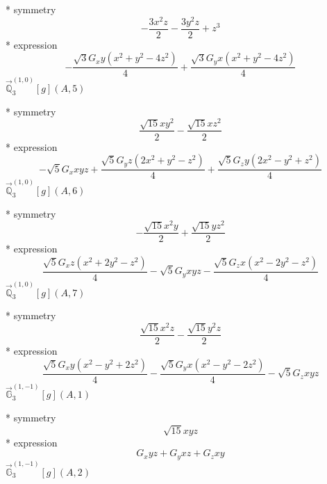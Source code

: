 \documentclass[fleqn,8pt]{jsarticle}
\begin{document}
\noindent\quad ** symmetry
\begin{dmath*}
- \frac{3 x^{2} z}{2} - \frac{3 y^{2} z}{2} + z^{3}
\end{dmath*}
\noindent\quad ** expression
\begin{dmath*}
- \frac{\sqrt{3} G_{x} y \left(x^{2} + y^{2} - 4 z^{2}\right)}{4} + \frac{\sqrt{3} G_{y} x \left(x^{2} + y^{2} - 4 z^{2}\right)}{4}
\end{dmath*}
\noindent\quad $\vec{\mathbb{Q}}_{3}^{(1,0)}[g](A,5)$

\noindent\quad ** symmetry
\begin{dmath*}
\frac{\sqrt{15} x y^{2}}{2} - \frac{\sqrt{15} x z^{2}}{2}
\end{dmath*}
\noindent\quad ** expression
\begin{dmath*}
- \sqrt{5} G_{x} x y z + \frac{\sqrt{5} G_{y} z \left(2 x^{2} + y^{2} - z^{2}\right)}{4} + \frac{\sqrt{5} G_{z} y \left(2 x^{2} - y^{2} + z^{2}\right)}{4}
\end{dmath*}
\noindent\quad $\vec{\mathbb{Q}}_{3}^{(1,0)}[g](A,6)$

\noindent\quad ** symmetry
\begin{dmath*}
- \frac{\sqrt{15} x^{2} y}{2} + \frac{\sqrt{15} y z^{2}}{2}
\end{dmath*}
\noindent\quad ** expression
\begin{dmath*}
\frac{\sqrt{5} G_{x} z \left(x^{2} + 2 y^{2} - z^{2}\right)}{4} - \sqrt{5} G_{y} x y z - \frac{\sqrt{5} G_{z} x \left(x^{2} - 2 y^{2} - z^{2}\right)}{4}
\end{dmath*}
\noindent\quad $\vec{\mathbb{Q}}_{3}^{(1,0)}[g](A,7)$

\noindent\quad ** symmetry
\begin{dmath*}
\frac{\sqrt{15} x^{2} z}{2} - \frac{\sqrt{15} y^{2} z}{2}
\end{dmath*}
\noindent\quad ** expression
\begin{dmath*}
\frac{\sqrt{5} G_{x} y \left(x^{2} - y^{2} + 2 z^{2}\right)}{4} - \frac{\sqrt{5} G_{y} x \left(x^{2} - y^{2} - 2 z^{2}\right)}{4} - \sqrt{5} G_{z} x y z
\end{dmath*}
\noindent\quad $\vec{\mathbb{G}}_{3}^{(1,-1)}[g](A,1)$

\noindent\quad ** symmetry
\begin{dmath*}
\sqrt{15} x y z
\end{dmath*}
\noindent\quad ** expression
\begin{dmath*}
G_{x} y z + G_{y} x z + G_{z} x y
\end{dmath*}
\noindent\quad $\vec{\mathbb{G}}_{3}^{(1,-1)}[g](A,2)$
\end{document}
